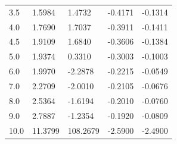 \begin{table}[hb]
{\begin{tabular}{ m{6em} m{6em}  m{6em}  m{6em} m{6em} }
        3.5 & 1.5984 & 1.4732 & -0.4171 & -0.1314 \\
        4.0 & 1.7690 & 1.7037 & -0.3911 & -0.1411 \\
        4.5 & 1.9109 & 1.6840 & -0.3606 & -0.1384 \\
        5.0 & 1.9374 & 0.3310 & -0.3003 & -0.1003 \\
        6.0 & 1.9970 & -2.2878 & -0.2215 & -0.0549 \\
        7.0 & 2.2709 & -2.0010 & -0.2105 & -0.0676 \\
        8.0 & 2.5364 & -1.6194 & -0.2010 & -0.0760 \\
        9.0 & 2.7887 & -1.2354 & -0.1920 & -0.0809 \\
        10.0 & 11.3799 & 108.2679 & -2.5900 & -2.4900 \\
		\hline
		\end{tabular}
}
\end{table}

